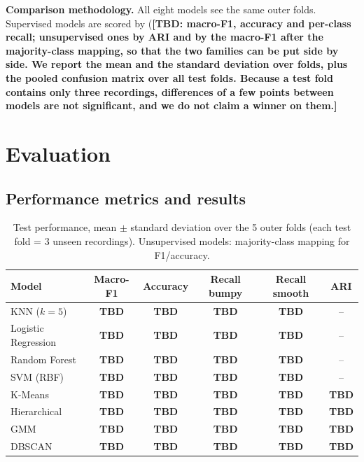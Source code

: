 \documentclass[10pt,a4paper]{article}
\newcommand{\tbd}[1]{\textbf{\textcolor{red!70!black}{[TBD: #1]}}}
\newcommand{\tbdc}{\textbf{\textcolor{red!70!black}{TBD}}}
\begin{document}
\textbf{Comparison methodology.} All eight models see the same outer folds. Supervised models are scored by (\tbd{macro-F1, accuracy and per-class recall; unsupervised ones by ARI and by the macro-F1 after the majority-class mapping, so that the two families can be put side by side. We report the mean and the standard deviation over folds, plus the pooled confusion matrix over all test folds. Because a test fold contains only three recordings, differences of a few points between models are not significant, and we do not claim a winner on them.}

\section{Evaluation}

\subsection{Performance metrics and results}

\begin{table}[!htbp]
\centering
\caption{Test performance, mean $\pm$ standard deviation over the 5 outer folds (each test fold = 3 unseen recordings). Unsupervised models: majority-class mapping for F1/accuracy.}
\label{tab:res}
\small
\begin{tabular}{lccccc}
\toprule
Model & Macro-F1 & Accuracy & Recall bumpy & Recall smooth & ARI\\
\midrule
KNN ($k=5$)              & \tbdc & \tbdc & \tbdc & \tbdc & --\\
Logistic Regression      & \tbdc & \tbdc & \tbdc & \tbdc & --\\
Random Forest            & \tbdc & \tbdc & \tbdc & \tbdc & --\\
SVM (RBF)                & \tbdc & \tbdc & \tbdc & \tbdc & --\\
\midrule
K-Means                  & \tbdc & \tbdc & \tbdc & \tbdc & \tbdc\\
Hierarchical             & \tbdc & \tbdc & \tbdc & \tbdc & \tbdc\\
GMM                      & \tbdc & \tbdc & \tbdc & \tbdc & \tbdc\\
DBSCAN                   & \tbdc & \tbdc & \tbdc & \tbdc & \tbdc\\
\bottomrule
\end{tabular}
\end{table}
\end{document}
